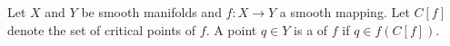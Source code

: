 Let $X$ and $Y$ be smooth manifolds and $f: X \to Y$ a smooth mapping. Let $C[f]$ denote the set of critical points of $f$. A point $q \in Y$ is a  of $f$ if $q \in f(C[f])$.
